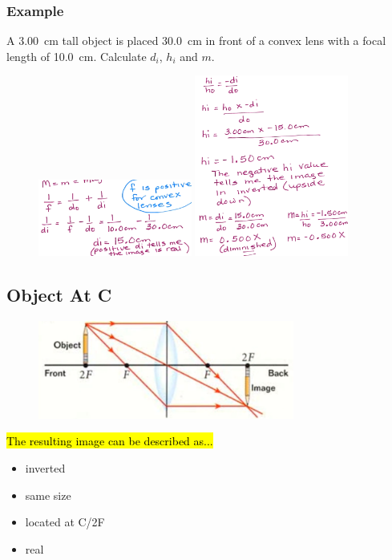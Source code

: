 \documentclass[a4paper,12pt]{article}
\begin{document}
\subsubsection{Example}
A \SI{3.00}{\cm} tall object is placed \SI{30.0}{\cm} in front of a convex lens with a focal length of \SI{10.0}{\cm}. Calculate $d_i$, $h_i$ and $m$.
\begin{figure}[H]
    \centering
    \includegraphics[width=0.45\textwidth]{ex-convex-1}
    \includegraphics[width=0.45\textwidth]{ex-convex-2}
\end{figure}

\pagebreak
\subsection{Object At C}
\begin{figure}[H]
    \centering
    \includegraphics[width=0.75\textwidth]{convex-atC}
\end{figure}

\hl{The resulting image can be described as...}
\begin{itemize}
    \item{inverted}
    \item{same size}
    \item{located at C/2F}
    \item{real}
\end{itemize}
\end{document}
